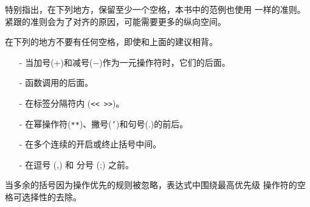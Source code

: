 \begin{blockindent}
特别指出，在下列地方，保留至少一个空格，本书中的范例也使用
一样的准则。紧跟的准则会为了对齐的原因，可能需要更多的纵向空间。
在下列的地方不要有任何空格，即使和上面的建议相背。
    \begin{itemize}
	\item[-] 当加号(+)和减号($-$)作为一元操作符时，它们的后面。
	\item[-] 函数调用的后面。
	\item[-] 在标签分隔符内 (\texttt{<< >>})。
	\item[-] 在幂操作符(\texttt{**})、撇号(\texttt{'})和句号(.)的前后。
	\item[-] 在多个连续的开启或终止括号中间。
	\item[-] 在逗号 (,) 和 分号 (;) 之前。
    \end{itemize}
当多余的括号因为操作优先的规则被忽略，表达式中围绕最高优先级
操作符的空格可选择性的去除。

\end{blockindent}


